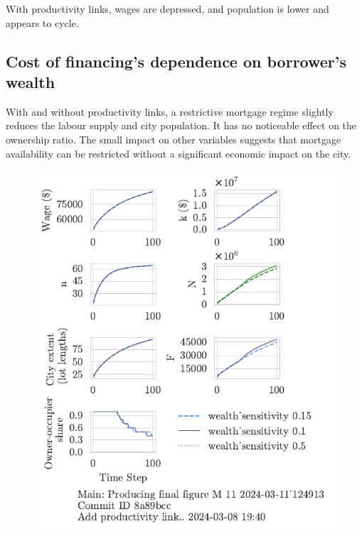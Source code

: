 {With productivity links, wages are depressed, and population is lower and appears to cycle.



\newpage %
\subsection{Cost of financing's dependence on borrower's wealth}

With and without productivity links, a restrictive mortgage regime slightly reduces the labour supply and city population. It has no noticeable effect on the ownership ratio. The small impact on other variables suggests that mortgage availability can be restricted %
without a significant economic impact on the city. 

\begin{figure}[h!tb] 
    \centering
    \includegraphics[scale=.75, trim={0 1.4cm 1.0cm 0},clip]{fig/wealth_sensitivity-124913.pdf} 

\end{figure}}
